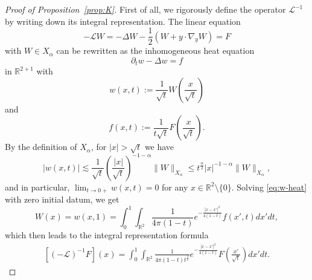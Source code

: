 \documentclass[12pt,reqno]{amsart}
\theoremstyle{plain}
\theoremstyle{definition}
\newcommand{\R}{\mathbb{R}}
\renewcommand{\:}{\colon}
\numberwithin{equation}{section}
\numberwithin{figure}{section}
\begin{document}
\begin{proof}[Proof of Proposition~\ref{prop:K}]
    First of all, we rigorously define the operator $\mathcal{L}^{-1}$ by writing down its integral representation.  The linear equation
    \begin{equation}
        -\mathcal{L}W = -\Delta W - \frac{1}{2} (W + y \cdot \nabla_y W) = F
    \end{equation}
    with $W \in X_\alpha$ can be rewritten as the inhomogeneous heat equation
    \begin{equation} \label{eq:w-heat}
        \partial_t w - \Delta w = f
    \end{equation}
    in $\R^{2+1}$ with
    \begin{equation}
        w(x,t) := \frac{1}{\sqrt{t}} W\left(\frac{x}{\sqrt{t}}\right)
    \end{equation}
    and
    \begin{equation}
        f(x,t) := \frac{1}{t\sqrt{t}} F\left(\frac{x}{\sqrt{t}}\right).
    \end{equation}
    By the definition of $X_\alpha$, for $|x|>\sqrt{t}$ we have
    \begin{equation}
        |w(x,t)| \lesssim \frac{1}{\sqrt{t}} \left( \frac{|x|}{\sqrt{t}}\right)^{-1-\alpha} \|W\|_{X_\alpha} \le t^{\frac{\alpha}{2}}|x|^{-1-\alpha} \|W\|_{X_\alpha},
    \end{equation}
    and in particular, $\lim_{t \to 0+} w(x,t) = 0$ for any $x \in \R^2 \setminus \{0\}$.   
    Solving \eqref{eq:w-heat} with zero initial datum, we get
    \begin{equation}
        W(x) = w(x,1) = \int_0^1 \int_{\R^2} \frac{1}{4 \pi (1-t)} e^{-\frac{|x-x'|^2}{4(1-t)}} f(x',t) dx'  dt,
    \end{equation}
    which then leads to the integral representation formula
    \begin{align} \label{eq:L-int-rep}
        [(-\mathcal{L})^{-1} F](x) =  \int_0^1 \int_{\R^2} \frac{1}{4 \pi (1-t) t^\frac32} e^{-\frac{|x-x'|^2}{4(1-t)}} F\left(\frac{x'}{\sqrt{t}}\right)  dx'  dt.
    \end{align}
    

\end{proof}
\end{document}
